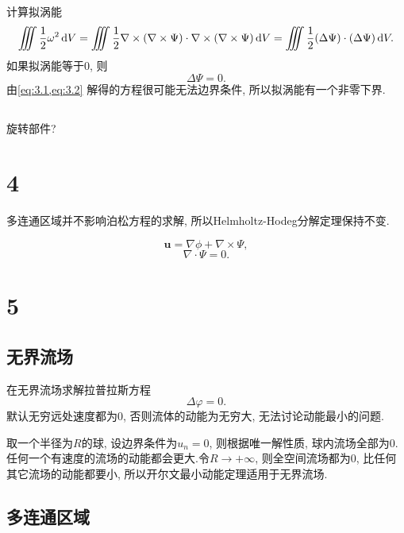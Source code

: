 \documentclass[12pt]{article}
\begin{document}
计算拟涡能
\begin{equation}
	\iiint \frac{1}{2} \omega^2 \dif V = \iiint \frac{1}{2} \nabla \times (\nabla \times \Psi) \cdot  \nabla \times (\nabla \times \Psi)  \dif V = \iiint \frac{1}{2} (\Delta \Psi) \cdot (\Delta \Psi) \dif V.
\end{equation}
如果拟涡能等于0, 则
\begin{equation}
	\Delta \Psi = 0.
	\label{eq:3.2}
\end{equation}
由\cref{eq:3.1,eq:3.2} 解得的方程很可能无法边界条件, 所以拟涡能有一个非零下界.

\subsection{}

旋转部件?




\section{4}

多连通区域并不影响泊松方程的求解, 所以Helmholtz-Hodeg分解定理保持不变.

\begin{equation}
	\bm{u} = \nabla \phi + \nabla \times \Psi,
\end{equation}
\begin{equation}
	\nabla \cdot \Psi = 0.
\end{equation}

\section{5}

\subsection{无界流场}

在无界流场求解拉普拉斯方程
\begin{equation}
	\Delta \varphi = 0.
	\label{eq:lapu}
\end{equation}
默认无穷远处速度都为0, 否则流体的动能为无穷大, 无法讨论动能最小的问题.

取一个半径为$R$的球, 设边界条件为$u_n = 0$, 则根据唯一解性质, 球内流场全部为0.任何一个有速度的流场的动能都会更大.令$R \to +\infty$, 则全空间流场都为0, 比任何其它流场的动能都要小, 所以开尔文最小动能定理适用于无界流场.

\subsection{多连通区域}
\end{document}
